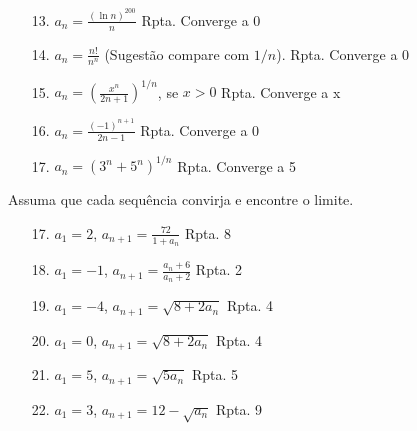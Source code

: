 \begin{itemize}
	\item [13.]$a_{n}=\frac{(\ln n)^{200}}{n}$ \quad\quad Rpta. Converge a 0
\end{itemize}
\begin{itemize}
	\item [14.] $a_{n}=\frac{n!}{n^{n}}$ (Sugestão compare com $1/n$). \quad\quad Rpta. Converge a 0
\end{itemize}
\begin{itemize}
	\item [15.] $a_{n}=(\frac{x^{n}}{2n+1})^{1/n}$, se $x>0$ \quad\quad Rpta. Converge a x
\end{itemize}
\begin{itemize}
	\item [16.] $a_{n}=\frac{(-1)^{n+1}}{2n-1}$ \quad\quad  Rpta. Converge a 0
\end{itemize}
\begin{itemize}
	\item [17.] $a_{n}=(3^{n}+5^{n})^{1/n}$  \quad\quad  Rpta. Converge a 5
\end{itemize}
Assuma que cada sequência convirja e encontre o limite.
\begin{itemize}
	\item [17.] $a_{1}=2$, $a_{n+1}= \frac{72}{1+a_{n}}$ \quad\quad  Rpta. 8
\end{itemize}
\begin{itemize}
	\item [18.] $a_{1}=-1$, $a_{n+1}= \frac{a_{n}+6}{a_{n}+2}$ \quad\quad  Rpta. 2
\end{itemize}	
\begin{itemize}
	\item [19.] $a_{1}=-4$, $a_{n+1}= \sqrt{8+2a_{n}}$ \quad\quad  Rpta. 4
\end{itemize}
\begin{itemize}
	\item [20.] $a_{1}=0$, $a_{n+1}= \sqrt{8+2a_{n}}$ \quad\quad  Rpta. 4
\end{itemize}
\begin{itemize}
	\item [21.] $a_{1}=5$, $a_{n+1}= \sqrt{5a_{n}}$ \quad\quad  Rpta. 5
\end{itemize}
\begin{itemize}
	\item [22.] $a_{1}=3$, $a_{n+1}= 12-\sqrt{a_{n}}$ \quad\quad  Rpta. 9
\end{itemize}
